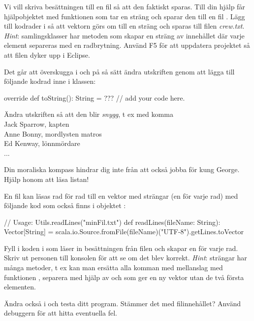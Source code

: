 \Subtask Vi vill skriva besättningen till en fil så att den faktiskt sparas. Till din hjälp får hjälpobjektet  med funktionen  som tar en sträng  och sparar den till en fil . Lägg till kodrader i  så att vektorn görs om till en sträng och sparas till filen \emph{crew.txt}. \emph{Hint}: samlingsklasser har metoden  som skapar en sträng av innehållet där varje element separeras med en radbrytning. Använd F5 för att uppdatera projektet så att filen dyker upp i Eclipse.



\Subtask Det går att överskugga  i  och på så sätt ändra utskriften genom att lägga till följande kodrad inne i klassen: 
\begin{Code}
override def toString(): String = ??? // add your code here. 
\end{Code}

\noindent Ändra utskriften så att den blir {\em snygg}, t ex med komma\\ 

\noindent Jack Sparrow, kapten \\
Anne Bonny, mordlysten matros \\
Ed Kenway, lönnmördare \\
... 

{}

\Subtask Din moraliska kompass hindrar dig inte från att också jobba för kung George. Hjälp honom att läsa listan!

En fil  kan läsas rad för rad till en vektor med strängar (en för varje rad) med följande kod som också finns i objektet : 

\begin{CodeSmall}
// Usage: Utils.readLines("minFil.txt")
def readLines(fileName: String): Vector[String] = {
			scala.io.Source.fromFile(fileName)("UTF-8").getLines.toVector
	}
\end{CodeSmall}
Fyll i koden i  som läser in besättningen från filen och skapar en  för varje rad. Skriv ut personen till konsolen för att se om det blev korrekt. \emph{Hint}: strängar har många metoder, t ex kan man ersätta alla komman med mellanslag med funktionen , separera med hjälp av  och  som ger en ny vektor utan de två första elementen.

\Subtask Ändra också i  och testa ditt program. Stämmer det med filinnehållet? Använd debuggern  för att hitta eventuella fel.

